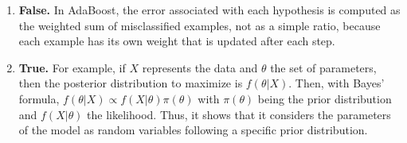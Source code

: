 \begin{enumerate}[label=\arabic*.]
    \item \textbf{False.} In AdaBoost, the error associated with each hypothesis is computed as the weighted sum of misclassified examples, not as a simple ratio, because each example has its own weight that is updated after each step.
    \item \textbf{True.} For example, if $X$ represents the data and $\theta$ the set of parameters, then the posterior distribution to maximize is $f(\theta | X)$. Then, with Bayes' formula, $f(\theta | X) \propto f(X | \theta)\pi(\theta)$ with $\pi(\theta)$ being the prior distribution and $f(X | \theta)$ the likelihood. Thus, it shows that it considers the parameters of the model as random variables following a specific prior distribution.
\end{enumerate}